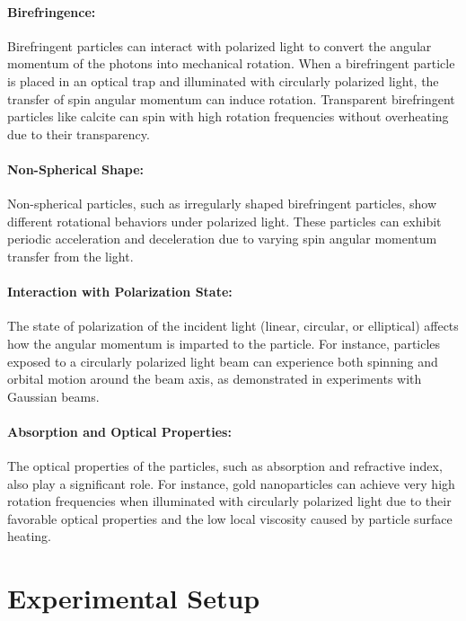 \documentclass[12pt,english,ngerman]{scrartcl}
\begin{document}
\paragraph{Birefringence:}
Birefringent particles can interact with polarized light to convert the angular
momentum of the photons into mechanical rotation. When a birefringent particle
is placed in an optical trap and illuminated with circularly polarized light,
the transfer of spin angular momentum can induce rotation. Transparent
birefringent particles like calcite can spin with high rotation frequencies
without overheating due to their
transparency.\cite{frieseOpticalAlignmentSpinning1998}

\paragraph{Non-Spherical Shape:}
Non-spherical particles, such as irregularly shaped birefringent particles,
show different rotational behaviors under polarized light. These particles can
exhibit periodic acceleration and deceleration due to varying spin angular
momentum transfer from the light.\cite{rothmayerIrregularSpinAngular2009}

\paragraph{Interaction with Polarization State:}
The state of polarization of the incident light (linear, circular, or
elliptical) affects how the angular momentum is imparted to the particle. For
instance, particles exposed to a circularly polarized light beam can experience
both spinning and orbital motion around the beam axis, as demonstrated in
experiments with Gaussian beams. \cite{angelskyCircularMotionParticles2012}

\paragraph{Absorption and Optical Properties:}
The optical properties of the particles, such as absorption and refractive
index, also play a significant role. For instance, gold nanoparticles can
achieve very high rotation frequencies when illuminated with circularly
polarized light due to their favorable optical properties and the low local
viscosity caused by particle surface heating.
\cite{lehmuskeroUltrafastSpinningGold2013}

\section{Experimental Setup}\label{sec:versuchsanordnung}
\end{document}
